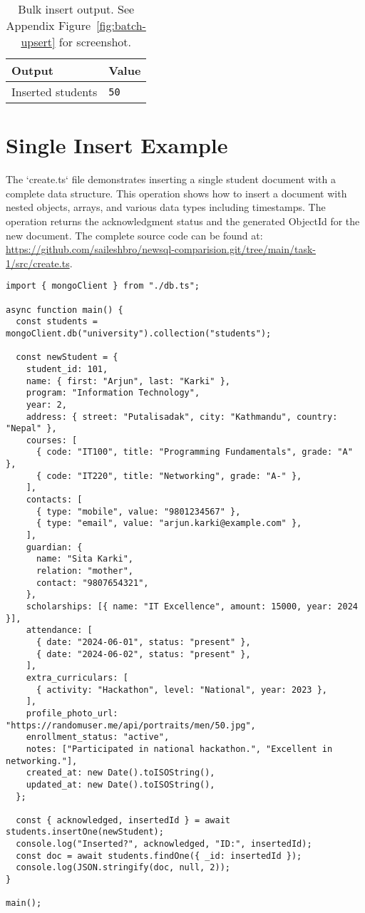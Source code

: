 \begin{table}[H]
  \centering
  \begin{tabular}{ll}
    \textbf{Output}   & \textbf{Value} \\
    \hline
    Inserted students & \texttt{50}             \\
  \end{tabular}
  \caption{Bulk insert output. See Appendix Figure~\ref{fig:batch-upsert} for screenshot.}
\end{table}

\section{Single Insert Example}
The `create.ts` file demonstrates inserting a single student document with a complete data structure. This operation shows how to insert a document with nested objects, arrays, and various data types including timestamps. The operation returns the acknowledgment status and the generated ObjectId for the new document. The complete source code can be found at: \url{https://github.com/saileshbro/newsql-comparision.git/tree/main/task-1/src/create.ts}.

\begin{verbatim}
import { mongoClient } from "./db.ts";

async function main() {
  const students = mongoClient.db("university").collection("students");

  const newStudent = {
    student_id: 101,
    name: { first: "Arjun", last: "Karki" },
    program: "Information Technology",
    year: 2,
    address: { street: "Putalisadak", city: "Kathmandu", country: "Nepal" },
    courses: [
      { code: "IT100", title: "Programming Fundamentals", grade: "A" },
      { code: "IT220", title: "Networking", grade: "A-" },
    ],
    contacts: [
      { type: "mobile", value: "9801234567" },
      { type: "email", value: "arjun.karki@example.com" },
    ],
    guardian: {
      name: "Sita Karki",
      relation: "mother",
      contact: "9807654321",
    },
    scholarships: [{ name: "IT Excellence", amount: 15000, year: 2024 }],
    attendance: [
      { date: "2024-06-01", status: "present" },
      { date: "2024-06-02", status: "present" },
    ],
    extra_curriculars: [
      { activity: "Hackathon", level: "National", year: 2023 },
    ],
    profile_photo_url: "https://randomuser.me/api/portraits/men/50.jpg",
    enrollment_status: "active",
    notes: ["Participated in national hackathon.", "Excellent in networking."],
    created_at: new Date().toISOString(),
    updated_at: new Date().toISOString(),
  };

  const { acknowledged, insertedId } = await students.insertOne(newStudent);
  console.log("Inserted?", acknowledged, "ID:", insertedId);
  const doc = await students.findOne({ _id: insertedId });
  console.log(JSON.stringify(doc, null, 2));
}

main();
\end{verbatim}

